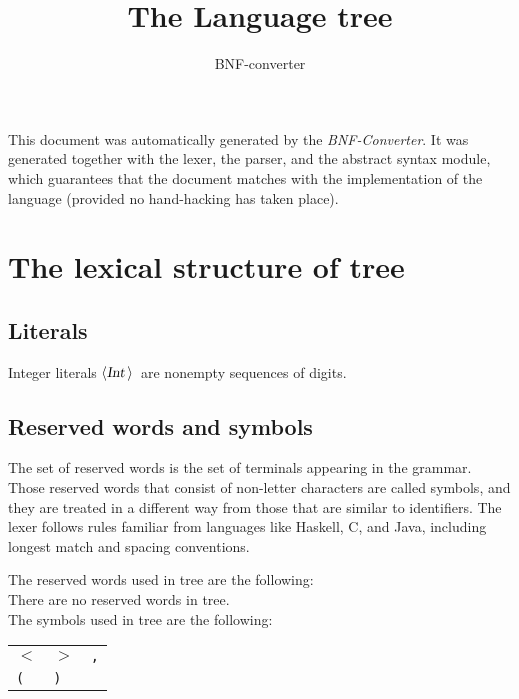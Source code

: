\documentclass[a4paper,11pt]{article}
\author{BNF-converter}
\title{The Language tree}
\begin{document}
\maketitle

\newcommand{\emptyP}{\mbox{$\epsilon$}}
\newcommand{\terminal}[1]{\mbox{{\texttt {#1}}}}
\newcommand{\nonterminal}[1]{\mbox{$\langle \mbox{{\sl #1 }} \! \rangle$}}
\newcommand{\arrow}{\mbox{::=}}
\newcommand{\delimit}{\mbox{$|$}}
\newcommand{\reserved}[1]{\mbox{{\texttt {#1}}}}
\newcommand{\literal}[1]{\mbox{{\texttt {#1}}}}
\newcommand{\symb}[1]{\mbox{{\texttt {#1}}}}

This document was automatically generated by the {\em BNF-Converter}. It was generated together with the lexer, the parser, and the abstract syntax module, which guarantees that the document matches with the implementation of the language (provided no hand-hacking has taken place).

\section*{The lexical structure of tree}

\subsection*{Literals}
Integer literals \nonterminal{Int}\ are nonempty sequences of digits.




\subsection*{Reserved words and symbols}
The set of reserved words is the set of terminals appearing in the grammar. Those reserved words that consist of non-letter characters are called symbols, and they are treated in a different way from those that are similar to identifiers. The lexer follows rules familiar from languages like Haskell, C, and Java, including longest match and spacing conventions.

The reserved words used in tree are the following: \\

There are no reserved words in tree.\\

The symbols used in tree are the following: \\

\begin{tabular}{lll}
{\symb{{$<$}}} &{\symb{{$>$}}} &{\symb{,}} \\
{\symb{(}} &{\symb{)}} & \\
\end{tabular}\\
\end{document}
